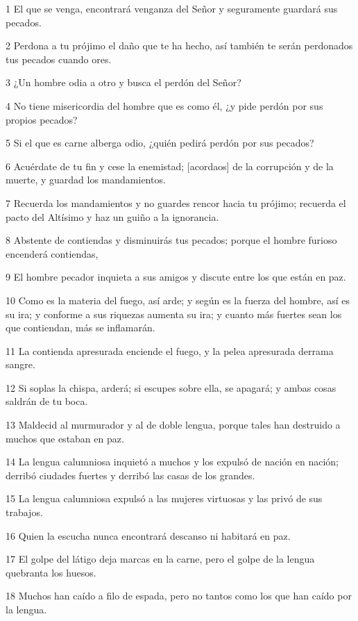 \par 1 El que se venga, encontrará venganza del Señor y seguramente guardará sus pecados.
\par 2 Perdona a tu prójimo el daño que te ha hecho, así también te serán perdonados tus pecados cuando ores.
\par 3 ¿Un hombre odia a otro y busca el perdón del Señor?
\par 4 No tiene misericordia del hombre que es como él, ¿y pide perdón por sus propios pecados?
\par 5 Si el que es carne alberga odio, ¿quién pedirá perdón por sus pecados?
\par 6 Acuérdate de tu fin y cese la enemistad; [acordaos] de la corrupción y de la muerte, y guardad los mandamientos.
\par 7 Recuerda los mandamientos y no guardes rencor hacia tu prójimo; recuerda el pacto del Altísimo y haz un guiño a la ignorancia.
\par 8 Abstente de contiendas y disminuirás tus pecados; porque el hombre furioso encenderá contiendas,
\par 9 El hombre pecador inquieta a sus amigos y discute entre los que están en paz.
\par 10 Como es la materia del fuego, así arde; y según es la fuerza del hombre, así es su ira; y conforme a sus riquezas aumenta su ira; y cuanto más fuertes sean los que contiendan, más se inflamarán.
\par 11 La contienda apresurada enciende el fuego, y la pelea apresurada derrama sangre.
\par 12 Si soplas la chispa, arderá; si escupes sobre ella, se apagará; y ambas cosas saldrán de tu boca.
\par 13 Maldecid al murmurador y al de doble lengua, porque tales han destruido a muchos que estaban en paz.
\par 14 La lengua calumniosa inquietó a muchos y los expulsó de nación en nación; derribó ciudades fuertes y derribó las casas de los grandes.
\par 15 La lengua calumniosa expulsó a las mujeres virtuosas y las privó de sus trabajos.
\par 16 Quien la escucha nunca encontrará descanso ni habitará en paz.
\par 17 El golpe del látigo deja marcas en la carne, pero el golpe de la lengua quebranta los huesos.
\par 18 Muchos han caído a filo de espada, pero no tantos como los que han caído por la lengua.
